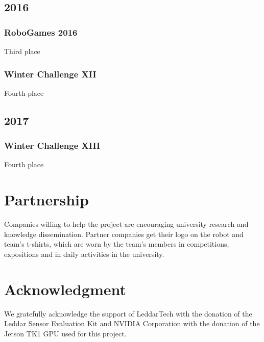 \documentclass[conference]{IEEEtran}
\begin{document}
\subsection*{2016}
\setcounter{subsubsection}{0}
\subsubsection{RoboGames 2016} Third place
\subsubsection{Winter Challenge XII} Fourth place
\subsection*{2017}
\setcounter{subsubsection}{0}
\subsubsection{Winter Challenge XIII} Fourth place

\section{Partnership}
Companies willing to help the project are encouraging university research and
knowledge dissemination. Partner companies get their logo on the robot and team's
t-shirts, which are worn by the team's members in competitions, expositions
and in daily activities in the university.

\section*{Acknowledgment}
We gratefully acknowledge the support of LeddarTech with the donation of the
Leddar Sensor Evaluation Kit and NVIDIA Corporation with the donation of
the Jetson TK1 GPU used for this project.
\end{document}
